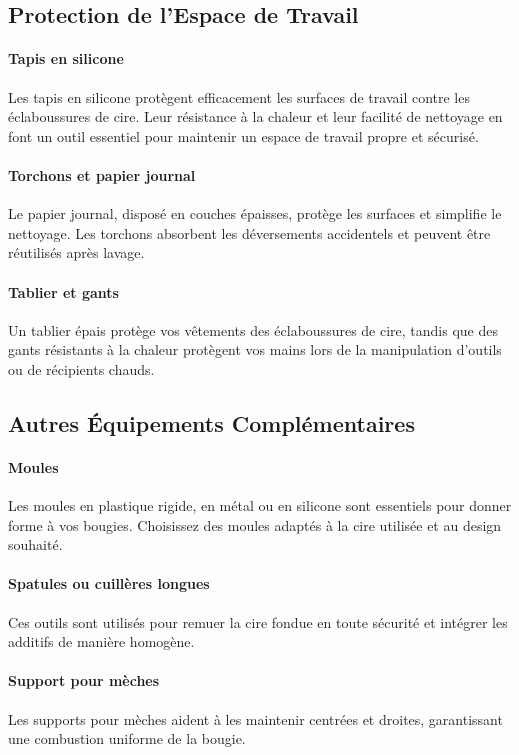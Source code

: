 \documentclass[11pt,fleqn,onecolumn,oneside]{book}
\begin{document}
\subsection*{Protection de l’Espace de Travail}

\paragraph{Tapis en silicone}
Les tapis en silicone protègent efficacement les surfaces de travail contre les éclaboussures de cire. Leur résistance à la chaleur et leur facilité de nettoyage en font un outil essentiel pour maintenir un espace de travail propre et sécurisé.

\paragraph{Torchons et papier journal}
Le papier journal, disposé en couches épaisses, protège les surfaces et simplifie le nettoyage. Les torchons absorbent les déversements accidentels et peuvent être réutilisés après lavage.

\paragraph{Tablier et gants}
Un tablier épais protège vos vêtements des éclaboussures de cire, tandis que des gants résistants à la chaleur protègent vos mains lors de la manipulation d’outils ou de récipients chauds.

\subsection*{Autres Équipements Complémentaires}

\paragraph{Moules}
Les moules en plastique rigide, en métal ou en silicone sont essentiels pour donner forme à vos bougies. Choisissez des moules adaptés à la cire utilisée et au design souhaité.

\paragraph{Spatules ou cuillères longues}
Ces outils sont utilisés pour remuer la cire fondue en toute sécurité et intégrer les additifs de manière homogène.

\paragraph{Support pour mèches}
Les supports pour mèches aident à les maintenir centrées et droites, garantissant une combustion uniforme de la bougie.
\end{document}

